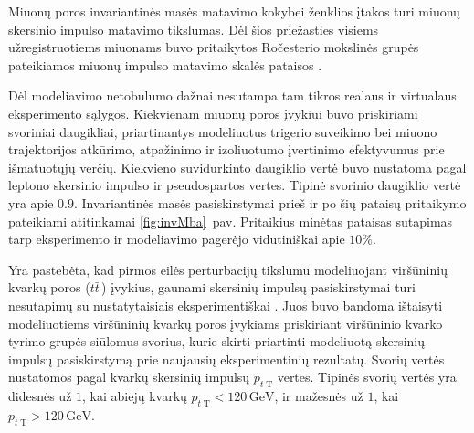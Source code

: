 \documentclass[a4paper, 12pt, oneside]{article}
\newcommand{\ttbar}{t\bar{t}}
\begin{document}
Miuonų poros invariantinės masės matavimo kokybei ženklios įtakos turi miuonų skersinio impulso matavimo tikslumas.
Dėl šios priežasties visiems užregistruotiems miuonams buvo pritaikytos Ročesterio mokslinės grupės pateikiamos
miuonų impulso matavimo skalės pataisos \cite{RocCorr}.

Dėl modeliavimo netobulumo dažnai nesutampa tam tikros realaus ir virtualaus eksperimento sąlygos.
Kiekvienam miuonų poros įvykiui buvo priskiriami svoriniai daugikliai, priartinantys modeliuotus trigerio
suveikimo bei miuono trajektorijos atkūrimo, atpažinimo ir izoliuotumo įvertinimo efektyvumus prie išmatuotųjų verčių.
Kiekvieno suvidurkinto daugiklio vertė buvo nustatoma pagal leptono skersinio impulso ir pseudospartos vertes.
Tipinė svorinio daugiklio vertė yra apie $0.9$.
Invariantinės masės pasiskirstymai prieš ir po šių pataisų pritaikymo pateikiami atitinkamai \ref{fig:invMba}~pav.
Pritaikius minėtas pataisas sutapimas tarp eksperimento ir modeliavimo pagerėjo vidutiniškai apie $10\%$.

Yra pastebėta, kad pirmos eilės perturbacijų tikslumu modeliuojant viršūninių kvarkų poros ($\ttbar\,$)
įvykius, gaunami skersinių impulsų pasiskirstymai turi nesutapimų su nustatytaisiais eksperimentiškai \cite{ttbarPT}.
Juos buvo bandoma ištaisyti modeliuotiems viršūninių kvarkų poros įvykiams priskiriant viršūninio kvarko tyrimo grupės
siūlomus svorius, kurie skirti priartinti modeliuotą skersinių impulsų pasiskirstymą prie naujausių eksperimentinių rezultatų.
Svorių vertės nustatomos pagal kvarkų skersinių impulsų $p_{t \; \mathrm{T}}$ vertes.
Tipinės svorių vertės yra didesnės už $1$, kai abiejų kvarkų $p_{t \; \mathrm{T}}<120 \, \mathrm{GeV}$, ir mažesnės už $1$,
kai $p_{t \; \mathrm{T}}>120 \, \mathrm{GeV}$.
\end{document}
